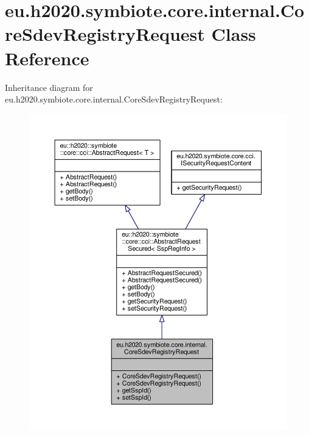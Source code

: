 \hypertarget{classeu_1_1h2020_1_1symbiote_1_1core_1_1internal_1_1CoreSdevRegistryRequest}{}\section{eu.\+h2020.\+symbiote.\+core.\+internal.\+Core\+Sdev\+Registry\+Request Class Reference}
\label{classeu_1_1h2020_1_1symbiote_1_1core_1_1internal_1_1CoreSdevRegistryRequest}


Inheritance diagram for eu.\+h2020.\+symbiote.\+core.\+internal.\+Core\+Sdev\+Registry\+Request\+:\nopagebreak
\begin{figure}[H]
\begin{center}
\leavevmode
\includegraphics[width=350pt]{classeu_1_1h2020_1_1symbiote_1_1core_1_1internal_1_1CoreSdevRegistryRequest__inherit__graph}
\end{center}
\end{figure}


